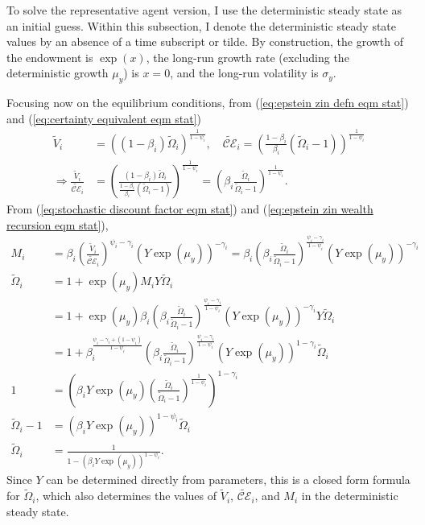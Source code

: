\documentclass[12 pt, oneside]{article}
\theoremstyle{definition}
\theoremstyle{definition}
\theoremstyle{definition}
\newcommand{\calC}{\mathcal{C}}
\newcommand{\calE}{\mathcal{E}}
\newcommand{\RA}{\Rightarrow}
\begin{document}
To solve the representative agent version, I use the deterministic steady state as an initial guess.
Within this subsection, I denote the deterministic steady state values by an absence of a time subscript or tilde. By construction, the growth of the endowment is $\exp(x)$, the long-run growth rate (excluding the deterministic growth $\mu_y$) is $x = 0$, and the long-run volatility is $\sigma_y$.

Focusing now on the equilibrium conditions, from (\ref{eq:epstein zin defn eqm stat}) and (\ref{eq:certainty equivalent eqm stat})
\begin{align*}
  \tilde{V}_i & = ((1 - \beta_i) \tilde{\Omega}_i)^{\frac{1}{1 - \psi_i}},\quad \tilde{\calC\calE}_i = \left(\frac{1 - \beta_i}{\beta_i} (\tilde{\Omega}_i - 1)\right)^{\frac{1}{1 - \psi_i}}\\
  \RA \frac{\tilde{V}_i}{\tilde{\calC\calE}_i} & = \left(\frac{(1 - \beta_i)\tilde{\Omega}_i}{\frac{1 - \beta_i}{\beta_i} (\tilde{\Omega}_i - 1)}\right)^{\frac{1}{1 - \psi_i}} = \left(\beta_i\frac{\tilde{\Omega}_i}{\tilde{\Omega}_i - 1}\right)^{\frac{1}{1 - \psi_i}}.
\end{align*}
From (\ref{eq:stochastic discount factor eqm stat}) and (\ref{eq:epstein zin wealth recursion eqm stat}),
\begin{align*}
  M_i & = \beta_i\left(\frac{\tilde{V}_i}{\tilde{\calC\calE}_i}\right)^{\psi_i - \gamma_i}(Y\exp(\mu_y))^{ - \gamma_i} = \beta_i\left(\beta_i\frac{\tilde{\Omega}_i}{\tilde{\Omega}_i - 1}\right)^{\frac{\psi_i - \gamma_i}{1 - \psi_i}}(Y\exp(\mu_y))^{ - \gamma_i}\\
  \tilde{\Omega}_i & = 1 + \exp(\mu_y)M_i Y \tilde{\Omega}_i\\
    & = 1 + \exp(\mu_y)\beta_i\left(\beta_i\frac{\tilde{\Omega}_i}{\tilde{\Omega}_i - 1}\right)^{\frac{\psi_i - \gamma_i}{1 - \psi_i}}(Y\exp(\mu_y))^{ - \gamma_i} Y \tilde{\Omega}_i\\
    & = 1 +\beta_i^{\frac{\psi_i - \gamma_i + (1 - \psi_i)}{1 - \psi_i}}\left(\beta_i\frac{\tilde{\Omega}_i}{\tilde{\Omega}_i - 1}\right)^{\frac{\psi_i - \gamma_i}{1 - \psi_i}}(Y\exp(\mu_y))^{1 - \gamma_i} \tilde{\Omega}_i\\
  1 & =  \left(\beta_i Y \exp(\mu_y)\left(\frac{\tilde{\Omega}_i}{\tilde{\Omega}_i - 1}\right)^{\frac{1}{1 - \psi_i}}\right)^{1 - \gamma_i}\\
  \tilde{\Omega}_i - 1 & = (\beta_i Y \exp(\mu_y))^{1 - \psi_i} \tilde{\Omega}_i\\
  \tilde{\Omega}_i & = \frac{1}{1 - (\beta_i Y \exp(\mu_y))^{1 - \psi_i}}.
\end{align*}
Since $Y$ can be determined directly from parameters, this is a closed form formula for $\tilde{\Omega}_i$, which also determines the values of $\tilde{V}_i$, $\tilde{\calC\calE}_i$, and $M_i$ in the deterministic steady state.
\end{document}
